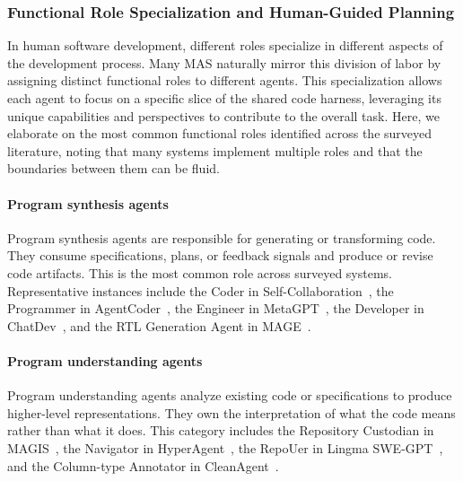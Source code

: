 \subsubsection{Functional Role Specialization and Human-Guided Planning}
In human software development, different roles specialize in
different aspects of the development process. Many MAS naturally
mirror this division of labor by assigning distinct functional
roles to different agents. This specialization allows each agent
to focus on a specific slice of the shared code harness,
leveraging its unique capabilities and perspectives to contribute
to the overall task.
Here, we elaborate on the most common functional roles identified
across the surveyed literature, noting that many systems
implement multiple roles and that the boundaries between them can
be fluid.

\paragraph{Program synthesis agents} Program synthesis agents are
responsible for generating or transforming code. They consume
specifications, plans, or feedback signals and produce or revise
code artifacts. This is the most common role across surveyed
systems. Representative instances include the Coder in
Self-Collaboration~\cite{Dong2024SelfCollaboration}, the
Programmer in AgentCoder~\cite{huang2023agentcoder}, the Engineer
in MetaGPT~\cite{Hong2023MetaGPT}, the Developer in
ChatDev~\cite{Qian2023ChatDev}, and the RTL Generation Agent in
MAGE~\cite{Zhao2024MAGE}.

\paragraph{Program understanding agents} Program understanding
agents analyze existing code or specifications to produce
higher-level representations. They own the interpretation of what
the code means rather than what it does. This category includes
the Repository Custodian in MAGIS~\cite{Tao2024Magis}, the
Navigator in HyperAgent~\cite{Phan2024HyperAgent}, the RepoUer in
Lingma SWE-GPT~\cite{Ma2024Lingma}, and the Column-type Annotator
in CleanAgent~\cite{Qi2024CleanAgent}.

